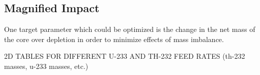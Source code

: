 \subsection{Magnified Impact}

One target parameter which could be optimized is the change in the net mass of the core over depletion in order to minimize effects of mass imbalance.

2D TABLES FOR DIFFERENT U-233 AND TH-232 FEED RATES (th-232 masses, u-233 masses, etc.)






